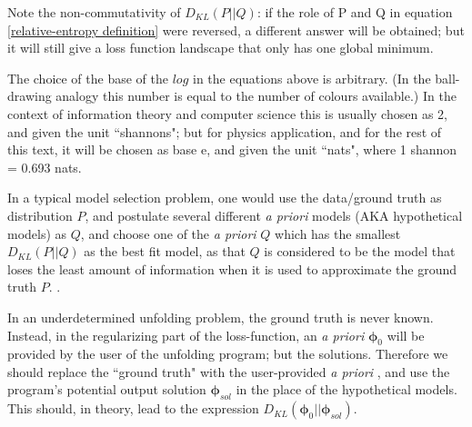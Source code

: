 \documentclass[a4paper, 12pt]{article}
\newcommand{\ve}[1]{\boldsymbol{#1}}
\newcommand{\apriori}[0]{\textit{a priori} }
\begin{document}
    Note the non-commutativity of $D_{KL}(P||Q)$: if the role of P and Q in equation \ref{relative-entropy definition} were reversed, a different answer will be obtained; but it will still give a loss function landscape that only has one global minimum.



    The choice of the base of the $log$ in the equations above is arbitrary. (In the ball-drawing analogy this number is equal to the number of colours available.) In the context of information theory and computer science this is usually chosen as 2, and given the unit ``shannons"; but for physics application, and for the rest of this text, it will be chosen as base e, and given the unit ``nats", where 1 shannon = 0.693 nats.

    In a typical model selection problem, one would use the data/ground truth as distribution $P$, and postulate several different \apriori models (AKA hypothetical models) as $Q$, and choose one of the \apriori $Q$ which has the smallest $D_{KL}(P||Q)$ as the best fit model, as that $Q$ is considered to be the model that loses the least amount of information when it is used to approximate the ground truth $P$. \cite{BurnhamKennethP2002Msam}.

    In an underdetermined unfolding problem, the ground truth is never known. Instead, in the regularizing part of the loss-function, an \apriori $\ve{\phi}_0$ will be provided by the user of the unfolding program; but the solutions. Therefore we should replace the ``ground truth" with the user-provided \apriori, and use the program's potential output solution $\ve{\phi}_{sol}$ in the place of the hypothetical models. This should, in theory, lead to the expression $D_{KL}(\ve{\phi}_0||\ve{\phi}_{sol})$.
\end{document}
